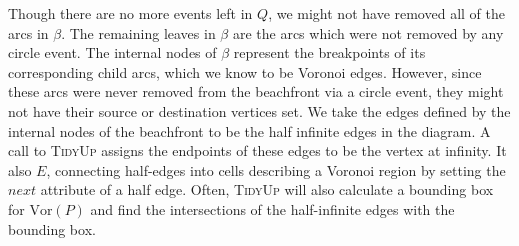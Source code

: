 \documentclass[12pt,twoside]{reedthesis}
\begin{document}
    Though there are no more events left in $Q$, we might not have removed all of the arcs in $\beta$. The remaining leaves in $\beta$ are the arcs which were not removed by any circle event. The internal nodes of $\beta$ represent the breakpoints of its corresponding child arcs, which we know to be Voronoi edges. However, since these arcs were never removed from the beachfront via a circle event, they might not have their source or destination vertices set. We take the edges defined by the internal nodes of the beachfront to be the half infinite edges in the diagram. A call to \textsc{TidyUp} assigns the endpoints of these edges to be the vertex at infinity. It also  $E$, connecting half-edges into cells describing a Voronoi region by setting the $next$ attribute of a half edge. Often, \textsc{TidyUp} will also calculate a bounding box for $\mbox{Vor}(P)$ and find the intersections of the half-infinite edges with the bounding box. 


  \clearpage
\end{document}
